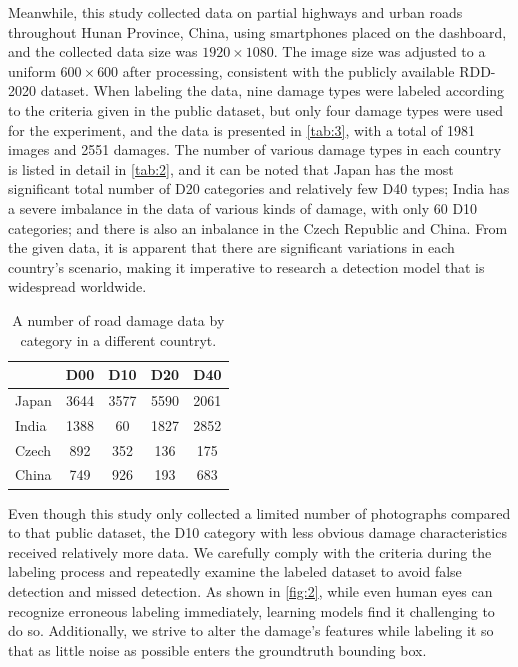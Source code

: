 \documentclass[sensors,article,submit,moreauthors]{Definitions/mdpi}
\begin{document}
    Meanwhile, this study collected data on partial highways and urban roads throughout Hunan Province, China, using smartphones placed on the dashboard, and the collected data size was $1920\times1080$. The image size was adjusted to a uniform $600\times600$ after processing, consistent with the publicly available RDD-2020 dataset. When labeling the data, nine damage types were labeled according to the criteria given in the public dataset, but only four damage types were used for the experiment, and the data is presented in \autoref{tab:3}, with a total of 1981 images and 2551 damages. The number of various damage types in each country is listed in detail in \autoref{tab:2}, and it can be noted that Japan has the most significant total number of D20 categories and relatively few D40 types; India has a severe imbalance in the data of various kinds of damage, with only 60 D10 categories; and there is also an inbalance in the Czech Republic and China. From the given data, it is apparent that there are significant variations in each country’s scenario, making it imperative to research a detection model that is widespread worldwide.

    \begin{table}[H]
        \caption{A number of road damage data by category in a different countryt.\label{tab:2}}
        \begin{tabularx}{\textwidth}{LCCCC}
            \toprule
            & \textbf{D00} & \textbf{D10} & \textbf{D20} & \textbf{D40} \\
            \midrule
            Japan & 3644         & 3577         & 5590         & 2061         \\
            India & 1388         & 60           & 1827         & 2852         \\
            Czech & 892          & 352          & 136          & 175          \\
            China & 749          & 926          & 193          & 683          \\
            \bottomrule
        \end{tabularx}
    \end{table}

    Even though this study only collected a limited number of photographs compared to that public dataset, the D10 category with less obvious damage characteristics received relatively more data. We carefully comply with the criteria during the labeling process and repeatedly examine the labeled dataset to avoid false detection and missed detection. As shown in \autoref{fig:2}, while even human eyes can recognize erroneous labeling immediately, learning models find it challenging to do so. Additionally, we strive to alter the damage's features while labeling it so that as little noise as possible enters the groundtruth bounding box.
\end{document}

